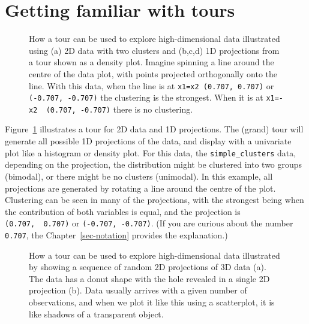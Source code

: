 \documentclass[
  letterpaper,
]{krantz}
\begin{document}
\section{Getting familiar with tours}\label{getting-familiar-with-tours}

\begin{figure}


\caption{\label{fig-explain-1D-pdf}How a tour can be used to explore
high-dimensional data illustrated using (a) 2D data with two clusters
and (b,c,d) 1D projections from a tour shown as a density plot. Imagine
spinning a line around the centre of the data plot, with points
projected orthogonally onto the line. With this data, when the line is
at \texttt{x1=x2\ (0.707,\ 0.707)} or \texttt{(-0.707,\ -0.707)} the
clustering is the strongest. When it is at
\texttt{x1=-x2\ \ (0.707,\ -0.707)} there is no clustering.
}

\end{figure}%

Figure~\ref{fig-explain-1D-pdf} illustrates a tour for 2D data and 1D
projections. The (grand) tour will generate all possible 1D projections
of the data, and display with a univariate plot like a histogram or
density plot. For this data, the \texttt{simple\_clusters} data,
depending on the projection, the distribution might be clustered into
two groups (bimodal), or there might be no clusters (unimodal). In this
example, all projections are generated by rotating a line around the
centre of the plot. Clustering can be seen in many of the projections,
with the strongest being when the contribution of both variables is
equal, and the projection is \texttt{(0.707,\ \ 0.707)} or
\texttt{(-0.707,\ -0.707)}. (If you are curious about the number
\texttt{0.707}, the Chapter~\ref{sec-notation} provides the
explanation.)  

\begin{figure}


\caption{\label{fig-explain-2D-pdf}How a tour can be used to explore
high-dimensional data illustrated by showing a sequence of random 2D
projections of 3D data (a). The data has a donut shape with the hole
revealed in a single 2D projection (b). Data usually arrives with a
given number of observations, and when we plot it like this using a
scatterplot, it is like shadows of a transparent object.
}

\end{figure}%
\end{document}
